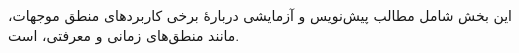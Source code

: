 \documentclass[../../include/open-logic-part]{subfiles}
\begin{document}

\begin{editorial}
این بخش شامل مطالب پیش‌نویس و آزمایشی دربارهٔ برخی کاربردهای منطق
موجهات، مانند منطق‌های زمانی و معرفتی، است.
\end{editorial}



\OLEndPartHook
\end{document}
